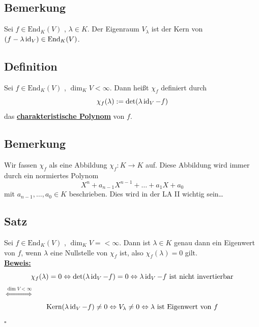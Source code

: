 \subsection{Bemerkung} %
\label{sub:bemerkung}
Sei $f \in \text{End}_K (V)$ , $\lambda  \in K$. Der Eigenraum $V_\lambda$ ist der Kern von $(f- \lambda \operatorname{id}_V) \in \text{End}_K (V)$.

\subsection{Definition} %
\label{sub:definition}
Sei $f \in \text{End}_K (V)$ , $\dim_K V < \infty$. Dann heißt $\chi_f$ definiert durch
\[
	\chi_f (\lambda ) := \det (\lambda \operatorname{id}_V -f )
\]
das \underline{\textbf{charakteristische Polynom}} von $f$.

\subsection{Bemerkung} %
\label{sub:bemerkung}
Wir fassen $\chi_f$ als eine Abbildung $\chi_f : K \to K$ auf. Diese Abbildung wird immer durch ein normiertes Polynom 
\[
	X^n + a_{n-1} X^{n-1} + \ldots + a_1 X + a_0
\]
mit $a_{n-1}, \ldots , a_0 \in K$ beschrieben. Dies wird in der LA II wichtig sein…

\subsection{Satz} %
\label{sub:satz}
Sei $f \in \text{End}_K (V)$ , $\dim_K V = < \infty$. Dann ist $\lambda \in K$ genau dann ein Eigenwert von $f$, wenn $\lambda $ eine Nullstelle von $\chi_f$ ist,
also $\chi_f (\lambda ) = 0$ gilt.
\vspace{10pt} \\
\underline{\textbf{Beweis:}} \\
\[
	\chi_f(\lambda ) = 0 \Leftrightarrow \det (\lambda \operatorname{id}_V - f) = 0 \Leftrightarrow \lambda \operatorname{id}_V -f \text{ ist nicht invertierbar}
\]
$\overset{\dim V < \infty}{\Longleftrightarrow}$ 
\[
	\text{Kern}(\lambda \operatorname{id}_V -f) \not= 0 \Leftrightarrow V_\lambda  \not= 0 \Leftrightarrow \lambda \text{ ist Eigenwert von }f
\]
\hfill \( \square \)

